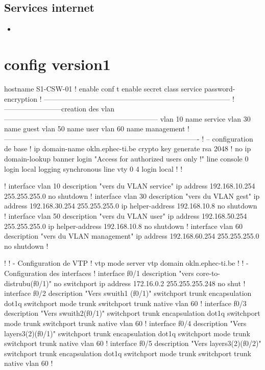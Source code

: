 \documentclass{article}
\begin{document}
    \subsection{Services internet}
        \begin{itemize}
            \item \url{}
        \end{itemize}
        
 \appendix
    \section{config version1}
    \scriptsize{}
    \begin{verbatimtab}[4]
hostname S1-CSW-01
!
enable
conf t
enable secret class 
service password-encryption
! ------------------------------------------------------------------------------
!------------------------creation des vlan-----------------------------------------------------------------
vlan 10 name service
vlan 30 name guest
vlan 50 name user
vlan 60 name management
!----------------------------------------------------------------------------------
! – configuration de base 
!
ip domain-name okln.ephec-ti.be
crypto key generate rsa
2048
!
no ip domain-lookup
banner login "Access for authorized users only !"
line console 0
  login local
  logging synchronous
line vty 0 4
  login local 
!
!

!
interface vlan 10
  description "vers du VLAN service"
  ip address 192.168.10.254 255.255.255.0
  no shutdown
!      
interface vlan 30
  description "vers du VLAN gest"
  ip address 192.168.30.254 255.255.255.0
  ip helper-address 192.168.10.8
  no shutdown
!
interface vlan 50
  description "vers du VLAN user"
  ip address 192.168.50.254 255.255.255.0
  ip helper-address 192.168.10.8
  no shutdown
!
interface vlan 60
  description "vers du VLAN management"
  ip address 192.168.60.254 255.255.255.0
  no shutdown
!

!
! - Configuration de VTP
!
vtp mode server
vtp domain okln.ephec-ti.be 
!
! - Configuration des interfaces
!       
interface f0/1
  description "vers core-to-distrubu(f0/1)"
  no switchport
  ip address 172.16.0.2 255.255.255.248
  no shut
!  
interface f0/2
  description "Vers swuith1 (f0/1)"
  switchport trunk encapsulation dot1q
  switchport mode trunk
  switchport trunk native vlan 60
!
interface f0/3
  description "Vers swuith2(f0/1)"
  switchport trunk encapsulation dot1q
  switchport mode trunk
  switchport trunk native vlan 60
!
interface f0/4
  description "Vers layers3(2)(f0/1)"
  switchport trunk encapsulation dot1q
  switchport mode trunk
  switchport trunk native vlan 60 
!
interface f0/5
  description "Vers layers3(2)(f0/2)"
  switchport trunk encapsulation dot1q
  switchport mode trunk
  switchport trunk native vlan 60 
!
 

\end{verbatimtab}
\end{document}
